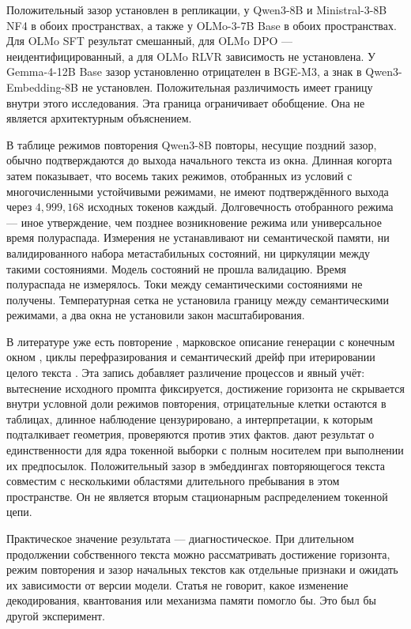 \documentclass[10pt]{article}
\begin{document}
Положительный зазор установлен в репликации,
у Qwen3-8B и Ministral-3-8B NF4 в обоих пространствах,
а также у OLMo-3-7B Base в обоих пространствах.
Для OLMo SFT результат смешанный, для OLMo DPO --- неидентифицированный,
а для OLMo RLVR зависимость не установлена.
У Gemma-4-12B Base зазор установленно отрицателен в BGE-M3,
а знак в Qwen3-Embedding-8B не установлен.
Положительная различимость имеет границу внутри этого исследования.
Эта граница ограничивает обобщение.
Она не является архитектурным объяснением.

В таблице режимов повторения Qwen3-8B повторы,
несущие поздний зазор, обычно подтверждаются до выхода
начального текста из окна.
Длинная когорта затем показывает, что восемь таких режимов,
отобранных из условий с многочисленными устойчивыми режимами,
не имеют подтверждённого выхода через $4{,}999{,}168$
исходных токенов каждый. %
Долговечность отобранного режима --- иное утверждение,
чем позднее возникновение режима или универсальное время полураспада.
Измерения не устанавливают ни семантической памяти,
ни валидированного набора метастабильных состояний,
ни циркуляции между такими состояниями.
Модель состояний не прошла валидацию.
Время полураспада не измерялось.
Токи между семантическими состояниями не получены.
Температурная сетка не установила границу между семантическими режимами,
а два окна не установили закон масштабирования.

В литературе уже есть повторение \citep{holtzman2020,xu2022},
марковское описание генерации с конечным окном \citep{zekri2024},
циклы перефразирования \citep{wang2025} и семантический дрейф
при итерировании целого текста \citep{geng2026}.
Эта запись добавляет различение процессов и явный учёт:
вытеснение исходного промпта фиксируется,
достижение горизонта не скрывается внутри условной доли режимов повторения,
отрицательные клетки остаются в таблицах,
длинное наблюдение цензурировано,
а интерпретации, к которым подталкивает геометрия,
проверяются против этих фактов.
\citet{zekri2024} дают результат о единственности для ядра токенной
выборки с полным носителем при выполнении их предпосылок.
Положительный зазор в эмбеддингах повторяющегося текста совместим
с несколькими областями длительного пребывания в этом пространстве.
Он не является вторым стационарным распределением токенной цепи.

Практическое значение результата --- диагностическое.
При длительном продолжении собственного текста можно рассматривать
достижение горизонта, режим повторения и зазор начальных текстов
как отдельные признаки и ожидать их зависимости от версии модели.
Статья не говорит, какое изменение декодирования,
квантования или механизма памяти помогло бы.
Это был бы другой эксперимент.
\end{document}
